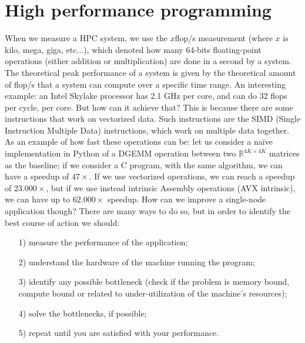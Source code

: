 \section{High performance programming}

When we measure a HPC system, we use the $x$flop/s measurement (where $x$ is kilo, mega, giga, etc...), which denoted how many 64-bits floating-point operations (either addition or multiplication) are done in a second by a system. The theoretical peak performance of a system is given by the theoretical amount of flop/s that a system can compute over a specific time range.
\nwl
An interesting example: an Intel Skylake processor has 2.1 GHz per core, and can do 32 flops per cycle, per core. But how can it achieve that? This is because there are some instructions that work on vectorized data. Such instructions are the SIMD (Single Instruction Multiple Data) instructions, which work on multiple data together.
\nwl
As an example of how fast these operations can be: let us consider a naïve implementation in Python of a DGEMM operation between two $\mathbb{R}^{4K \times 4K}$ matrices as the baseline; if we consider a C program, with the same algorithm, we can have a speedup of $47\times$. If we use vectorized operations, we can reach a speedup of $23.000\times$, but if we use instead intrinsic Assembly operations (AVX intrinsic), we can have up to $62.000 \times$ speedup.
\nwl
How can we improve a single-node application though? There are many ways to do so, but in order to identify the best course of action we should:
\begin{itemize}
    \item [1)] measure the performance of the application;
    \item [2)] understand the hardware of the machine running the program;
    \item [3)] identify any possible bottleneck (check if the problem is memory bound, compute bound or related to under-utilization of the machine's resources);
    \item [4)] solve the bottlenecks, if possible;
    \item [5)] repeat until you are satisfied with your performance.
\end{itemize}

